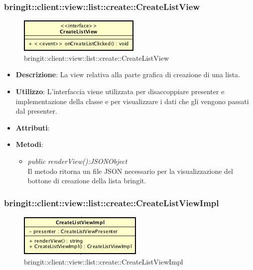 \subsubsection{bringit::client::view::list::create::CreateListView}

\label{bringit::client::view::list::create::CreateListView}
\begin{figure}[H]
	\centering
	\includegraphics[scale=0.5]{Sezioni/SottosezioniST/img/app/CreateListView.png}
	\caption{bringit::client::view::list::create::CreateListView}
\end{figure}

\begin{itemize}
\item \textbf{Descrizione}: La view relativa alla parte grafica di creazione di una lista.
\item \textbf{Utilizzo}: L'interfaccia viene utilizzata per disaccoppiare presenter e implementazione della classe e per visualizzare i dati che gli vengono passati dal presenter.
\item \textbf{Attributi}: 
\item \textbf{Metodi}:
	\begin{itemize}
	\item \textit{public renderView():JSONObject}\\
	Il metodo ritorna un file JSON necessario per la visualizzazione del bottone di creazione della lista bringit.
	\end{itemize}
\end{itemize} 

\subsubsection{bringit::client::view::list::create::CreateListViewImpl}

\label{bringit::client::view::list::create::CreateListViewImpl}
\begin{figure}[H]
	\centering
	\includegraphics[scale=0.5]{Sezioni/SottosezioniST/img/app/CreateListViewImpl.png}
	\caption{bringit::client::view::list::create::CreateListViewImpl}
\end{figure}

